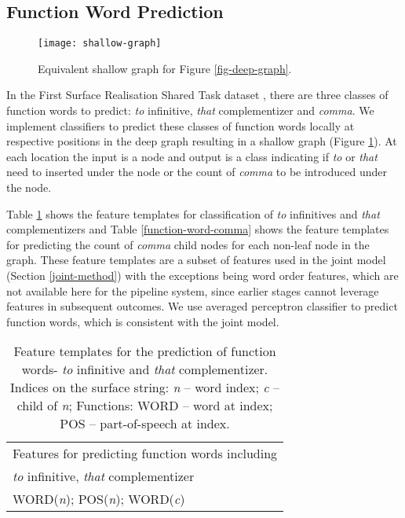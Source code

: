 \documentclass[11pt]{article}
\begin{document}
\subsection{Function Word Prediction}
\label{function-word-prediction}

\begin{figure}[t]
\centering
\small
\texttt{[image: shallow-graph]}
\caption{Equivalent shallow graph for Figure \ref{fig-deep-graph}.}
\label{fig-shallow-graph}
\vspace*{-1em}
\end{figure}

In the First Surface Realisation Shared Task dataset \cite{belz2011first}, there are three classes of function words to predict: {\it to} infinitive, {\it that} complementizer and {\it comma}. We implement classifiers to predict these classes of function words locally at respective positions in the deep graph resulting in a shallow graph (Figure \ref{fig-shallow-graph}). At each location the input  is a node and output is a class indicating if {\it to} or {\it that} need to inserted under the node or the count of {\it comma} to be introduced under the node. 

Table \ref{function-word-to-that} shows the feature templates for classification of {\it to} infinitives and {\it that} complementizers and Table \ref{function-word-comma} shows the feature templates for predicting the count of {\it comma} child nodes for each non-leaf node in the graph. These feature templates are a subset of features used in the joint model (Section \ref{joint-method}) with the exceptions being word order features, which are not available here for the pipeline system, since earlier stages cannot leverage features in subsequent outcomes. We use averaged perceptron classifier \cite{W02-1001} to predict function words, which is consistent with the joint model. 
\begin{table}\centering
\footnotesize
\begin{tabular}{|l|}

  \hline
  Features for predicting function words including \\{\it to} infinitive, {\it that} complementizer \\
\hline
	WORD({\it n}); POS({\it n});	WORD({\it c}) \\
  \hline
  
\end{tabular}
\caption{Feature templates for the prediction of function words- {\it to} infinitive and {\it that} complementizer. Indices on the surface string: {\it n} -- word index; {\it c} -- child of {\it n}; Functions: WORD -- word at index; POS -- part-of-speech at index.}
\label{function-word-to-that}
\end{table}
\end{document}
